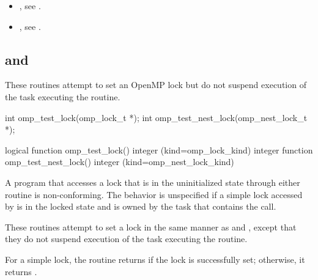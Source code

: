 \crossreferences
\begin{itemize}
\item {}, see
.
\item {}, see
.
\end{itemize}








\subsection{ and }
\label{subsec:omp_test_lock and omp_test_nest_lock}
\summary
These routines attempt to set an OpenMP lock but do not suspend execution of the task
executing the routine.

\format
\begin{ccppspecific}
\begin{ompcFunction}
int omp_test_lock(omp_lock_t *);
int omp_test_nest_lock(omp_nest_lock_t *);
\end{ompcFunction}
\end{ccppspecific}

\begin{fortranspecific}
\begin{ompfFunction}
logical function omp_test_lock()
integer (kind=omp_lock_kind) 
integer function omp_test_nest_lock()
integer (kind=omp_nest_lock_kind) 
\end{ompfFunction}
\end{fortranspecific}

\constraints
A program that accesses a lock that is in the uninitialized state through either routine is
non-conforming. The behavior is unspecified if a simple lock accessed by
 is in the locked state and is owned by the task that contains the call.

\effect
These routines attempt to set a lock in the same manner as  and
, except that they do not suspend execution of the task
executing the routine.

For a simple lock, the  routine returns  if the lock is successfully
set; otherwise, it returns .

